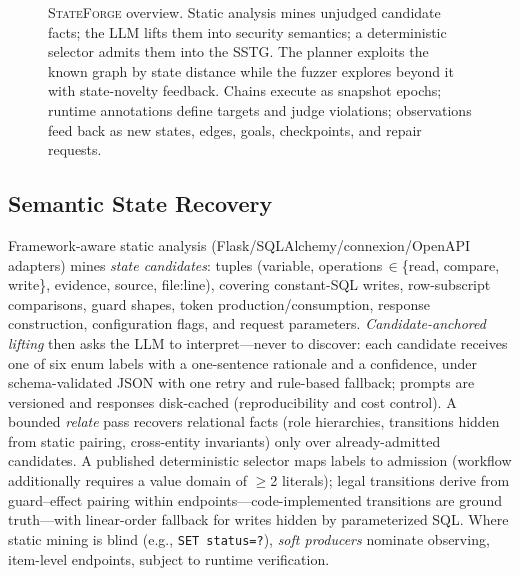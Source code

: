 \documentclass[letterpaper,twocolumn,10pt]{article}
\newcommand{\sys}{\textsc{StateForge}}
\begin{document}
\begin{figure}[t]
\caption{\sys{} overview. Static analysis mines unjudged candidate facts; the LLM lifts them into security semantics; a deterministic selector admits them into the SSTG. The planner exploits the known graph by state distance while the fuzzer explores beyond it with state-novelty feedback. Chains execute as snapshot epochs; runtime annotations define targets and judge violations; observations feed back as new states, edges, goals, checkpoints, and repair requests.}
\label{fig:overview}
\end{figure}

\subsection{Semantic State Recovery}
\label{sec:recovery}
Framework-aware static analysis (Flask/SQLAlchemy/connexion/OpenAPI adapters) mines \emph{state candidates}: tuples (variable, operations\,$\in$\{read, compare, write\}, evidence, source, file:line), covering constant-SQL writes, row-subscript comparisons, guard shapes, token production/consumption, response construction, configuration flags, and request parameters. \emph{Candidate-anchored lifting} then asks the LLM to interpret---never to discover: each candidate receives one of six enum labels with a one-sentence rationale and a confidence, under schema-validated JSON with one retry and rule-based fallback; prompts are versioned and responses disk-cached (reproducibility and cost control). A bounded \emph{relate} pass recovers relational facts (role hierarchies, transitions hidden from static pairing, cross-entity invariants) only over already-admitted candidates. A published deterministic selector maps labels to admission (workflow additionally requires a value domain of $\geq$2 literals); legal transitions derive from guard--effect pairing within endpoints---code-implemented transitions are ground truth---with linear-order fallback for writes hidden by parameterized SQL. Where static mining is blind (e.g., \texttt{SET status=?}), \emph{soft producers} nominate observing, item-level endpoints, subject to runtime verification.
\end{document}
